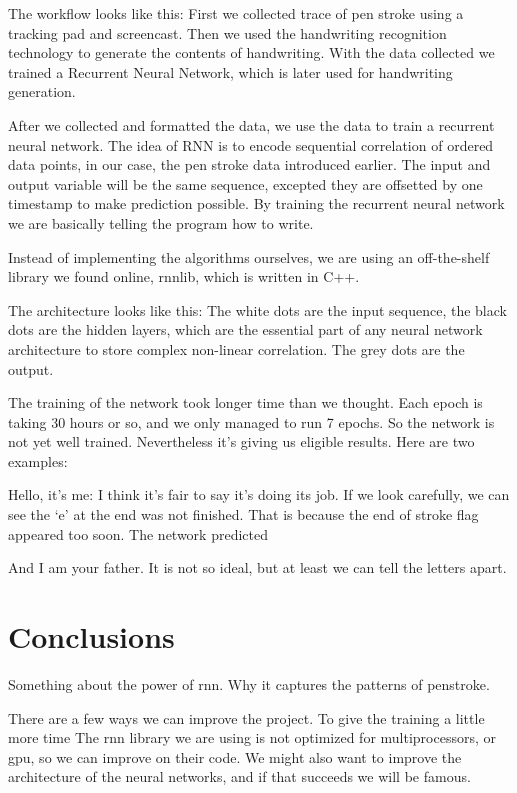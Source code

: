 \documentclass{article} %
\begin{document}
The workflow looks like this: 
First we collected trace of pen stroke using a tracking pad and screencast. Then we used the handwriting recognition technology to generate the contents of handwriting. With the data collected we trained a Recurrent Neural Network, which is later used for handwriting generation. 


After we collected and formatted the data, we use the data to train a recurrent neural network. The idea of RNN is to encode sequential correlation of ordered data points, in our case, the pen stroke data introduced earlier. The input and output variable will be the same sequence, excepted they are offsetted by one timestamp to make prediction possible. By training the recurrent neural network we are basically telling the program how to write. 


Instead of implementing the algorithms ourselves, we are using an off-the-shelf library we found online, rnnlib, which is written in C++. 


The architecture looks like this: 
The white dots are the input sequence, the black dots are the hidden layers, which are the essential part of any neural network architecture to store complex non-linear correlation. The grey dots are the output. 


The training of the network took longer time than we thought. Each epoch is taking 30 hours or so, and we only managed to run 7 epochs. So the network is not yet well trained. Nevertheless it’s giving us eligible results. Here are two examples: 


Hello, it’s me: 
I think it’s fair to say it’s doing its job. 
If we look carefully, we can see the ‘e’ at the end was not finished. That is because the end of stroke flag appeared too soon. The network predicted 


And I am your father.  
It is not so ideal, but at least we can tell the letters apart. 





\section{Conclusions}
Something about the power of rnn. Why it captures the patterns of penstroke. 

There are a few ways we can improve the project. 
To give the training a little more time
The rnn library we are using is not optimized for multiprocessors, or gpu, so we can improve on their code. 
We might also want to improve the architecture of the neural networks, and if that succeeds we will be famous. 
\end{document}
